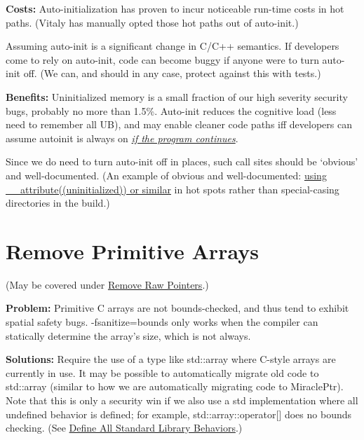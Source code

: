 \documentclass[a4paper,12pt,notitlepage,twoside,openright]{article}
\newcommand{\uline}[1]{#1}
\begin{document}
{\textbf{Costs:} Auto-initialization has proven to incur noticeable
run-time costs in hot paths. (Vitaly has manually opted those hot paths
out of auto-init.)

Assuming auto-init is a significant change in C/C++ semantics. If
developers come to rely on auto-init, code can become buggy if anyone
were to turn auto-init off. (We can, and should in any case, protect
against this with tests.)

\textbf{Benefits:} Uninitialized memory is a small fraction of our high
severity security bugs, probably no more than 1.5\%. Auto-init reduces
the cognitive load (less need to remember all UB), and may enable
cleaner code paths iff developers can assume autoinit is always
on \href{https://www.google.com/url?q=https://lists.llvm.org/pipermail/cfe-dev/2020-April/065233.html\&sa=D\&source=editors\&ust=1631944129084000\&usg=AOvVaw2T_sqx8Nl21LBxNUvi3dis}{\emph{\uline{if
the program continues}}}.

Since we do need to turn auto-init off in places, such call sites should
be `obvious' and well-documented. (An example of obvious and
well-documented: \uline{\href{https://www.google.com/url?q=https://source.chromium.org/chromium/chromium/src/\%2B/master:sandbox/win/src/sandbox_nt_util.cc;l\%3D63?q\%3Dtrivial-auto-var-init\%26ss\%3Dchromium\&sa=D\&source=editors\&ust=1631944129084000\&usg=AOvVaw3bHIFqDRxdVpYasCoj9_By}{using }\href{https://www.google.com/url?q=https://source.chromium.org/chromium/chromium/src/\%2B/master:sandbox/win/src/sandbox_nt_util.cc;l\%3D63?q\%3Dtrivial-auto-var-init\%26ss\%3Dchromium\&sa=D\&source=editors\&ust=1631944129085000\&usg=AOvVaw0ZvsfgE7IGTXJXGf3A71BS}{\_\_attribute((uninitialized)) or
similar}} in hot spots rather than special-casing directories in the
build.)

\section{Remove Primitive Arrays}

(May be covered
under \href{https://docs.google.com/document/d/e/2PACX-1vRZr-HJcYmf2Y76DhewaiJOhRNpjGHCxliAQTBhFxzv1QTae9o8mhBmDl32CRIuaWZLt5kVeH9e9jXv/pub\#h.c3notccb295u}{\uline{Remove
Raw Pointers}}.)

\textbf{Problem:} Primitive C arrays are not bounds-checked, and thus
tend to exhibit spatial safety bugs. -fsanitize=bounds only works when
the compiler can statically determine the array's size, which is not
always.

\textbf{Solutions:} Require the use of a type like std::array where
C-style arrays are currently in use. It may be possible to automatically
migrate old code to std::array (similar to how we are automatically
migrating code to MiraclePtr). Note that this is only a security win if
we also use a std implementation where all undefined behavior is
defined; for example, std::array::operator{[}{]} does no bounds
checking.
(See \href{https://docs.google.com/document/d/e/2PACX-1vRZr-HJcYmf2Y76DhewaiJOhRNpjGHCxliAQTBhFxzv1QTae9o8mhBmDl32CRIuaWZLt5kVeH9e9jXv/pub\#h.ji6or6kpi3sa}{\uline{Define
All Standard Library Behaviors}}.)

}
\end{document}
